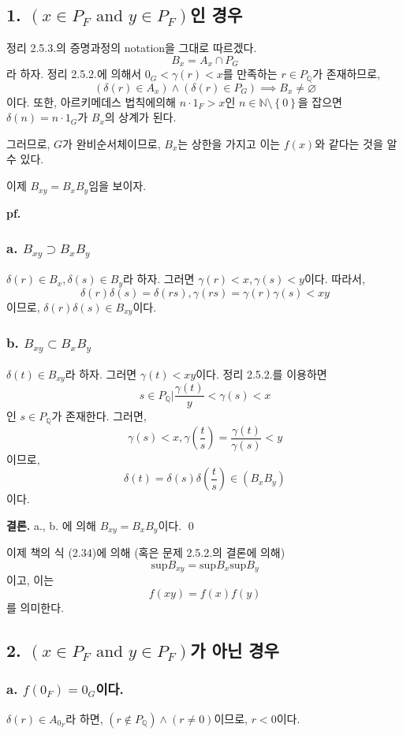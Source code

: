 \documentclass{article}
\begin{document}
\subsection{1. $(x \in P_F \text{ and } y \in P_F)$인 경우}
정리 2.5.3.의 증명과정의 notation을 그대로 따르겠다.
$$B_x = A_x \cap P_G$$라 하자.
정리 2.5.2.에 의해서 $0_G < \gamma(r) < x$를 만족하는 $r \in P_\mathbb{Q}$가 존재하므로, 
$$(\delta(r) \in A_x) \wedge (\delta(r) \in P_G)  \implies B_x \neq \varnothing$$
이다. 또한, 아르키메데스 법칙에의해 $n \cdot 1_F > x$인 $n \in \mathbb{N} \setminus \left\{0\right\}$을 잡으면 $\delta(n) = n \cdot 1_G$가 $B_x$의 상계가 된다.

그러므로, $G$가 완비순서체이므로, $B_x$는 상한을 가지고 이는 $f(x)$와 같다는 것을 알 수 있다.

이제 $B_{xy} = B_x B_y$임을 보이자.

\textbf{pf.}
\subsubsection{a. $B_{xy} \supset B_x B_y$}
$\delta(r) \in B_x, \delta(s) \in B_y$라 하자. 그러면
$\gamma(r) < x, \gamma(s) < y$이다. 따라서,
$$ \delta(r) \delta(s) = \delta(rs), \gamma(rs) = \gamma(r) \gamma(s) < xy$$
이므로, $\delta(r) \delta(s) \in B_{xy}$이다.
\subsubsection{b. $B_{xy} \subset B_x B_y$}
$\delta(t) \in B_{xy}$라 하자. 그러면 $\gamma(t) < xy$이다. 정리 2.5.2.를 이용하면
$$ s \in P_\mathbb{Q} \bigg| \frac{\gamma(t)}{y} < \gamma(s) < x$$
인 $s \in P_\mathbb{Q}$가 존재한다. 그러면,
$$ \gamma(s) < x, \gamma\left(\frac{t}{s}\right) = \frac{\gamma(t)}{\gamma(s)} < y$$
이므로, 
$$\delta(t) = \delta(s) \delta\left(\frac{t}{s}\right) \in \left(B_x B_y\right)$$
이다.

\textbf{결론.} a., b. 에 의해 $B_{xy} = B_x B_y$이다.
\qed

이제 책의 식 (2.34)에 의해 (혹은 문제 2.5.2.의 결론에 의해)
$$\text{sup} B_{xy} = \text{sup} B_x \text{sup} B_y$$이고, 이는
$$f(xy) = f(x)f(y)$$를 의미한다.

\subsection{2. $(x \in P_F \text{ and } y \in P_F)$가 아닌 경우}
\subsubsection{a. $f(0_F) = 0_G$이다.}
$\delta(r) \in A_{0_F}$라 하면, $(r \notin P_\mathbb{Q}) \wedge (r \neq 0)$이므로, $r < 0$이다.
\end{document}
